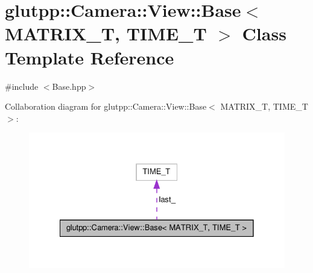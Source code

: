 \hypertarget{classglutpp_1_1Camera_1_1View_1_1Base}{\section{glutpp\-:\-:\-Camera\-:\-:\-View\-:\-:\-Base$<$ \-M\-A\-T\-R\-I\-X\-\_\-\-T, \-T\-I\-M\-E\-\_\-\-T $>$ \-Class \-Template \-Reference}
\label{classglutpp_1_1Camera_1_1View_1_1Base}
}


 




{\ttfamily \#include $<$\-Base.\-hpp$>$}



\-Collaboration diagram for glutpp\-:\-:\-Camera\-:\-:\-View\-:\-:\-Base$<$ \-M\-A\-T\-R\-I\-X\-\_\-\-T, \-T\-I\-M\-E\-\_\-\-T $>$\-:\nopagebreak
\begin{figure}[H]
\begin{center}
\leavevmode
\includegraphics[width=328pt]{classglutpp_1_1Camera_1_1View_1_1Base__coll__graph}
\end{center}
\end{figure}
